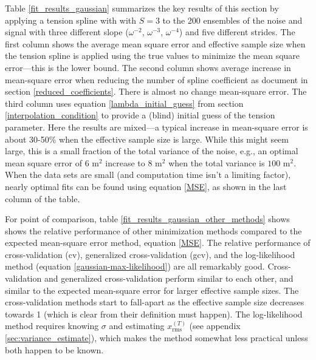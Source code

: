 \documentclass[10pt,journal]{IEEEtran}
\begin{document}
Table \ref{fit_results_gaussian} summarizes the key results of this section by applying a tension spline with with $S=3$ to the 200 ensembles of the noise and signal with three different slope ($\omega^{-2}$, $\omega^{-3}$, $\omega^{-4}$) and five different strides. The first column shows the average mean square error and effective sample size when the tension spline is applied using the true values to minimize the mean square error---this is the lower bound. The second column shows average increase in mean-square error when reducing the number of spline coefficient as document in section \ref{reduced_coefficients}. There is almost no change mean-square error. The third column uses equation \ref{lambda_initial_guess} from section \ref{interpolation_condition} to provide a (blind) initial guess of the tension parameter. Here the results are mixed---a typical increase in mean-square error is about 30-50\% when the effective sample size is large. While this might seem large, this is a small fraction of the total variance of the noise, e.g., an optimal mean square error of $6$ m$^2$ increase to $8$ m$^2$ when the total variance is $100$ m$^2$. When the data sets are small (and computation time isn't a limiting factor), nearly optimal fits can be found using equation \ref{MSE}, as shown in the last column of the table.

For point of comparison, table \ref{fit_results_gaussian_other_methods} shows shows the relative performance of other minimization methods compared to the expected mean-square error method, equation \ref{MSE}.  The relative performance of cross-validation (cv), generalized cross-validation (gcv), and the log-likelihood method (equation \ref{gaussian-max-likelihood}) are all remarkably good. Cross-validation and generalized cross-validation perform similar to each other, and similar to the expected mean-square error for larger effective sample sizes. The cross-validation methods start to fall-apart as the effective sample size decreases towards 1 (which is clear from their definition must happen). The log-likelihood method requires knowing $\sigma$ and estimating $x_\textrm{rms}^{(T)}$ (see appendix \ref{sec:variance_estimate}), which makes the method somewhat less practical unless both happen to be known.
\end{document}
